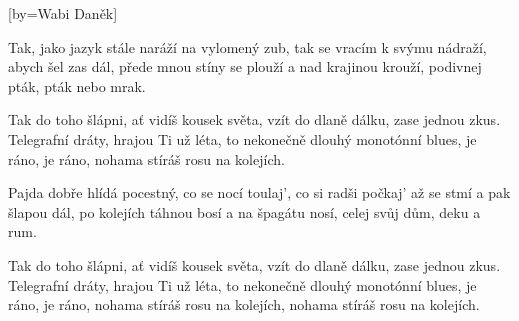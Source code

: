 [by={Wabi Daněk}]

\beginverse{}
Tak, jako jazyk stále naráží na vylomený zub,
tak se vracím k svýmu nádraží, abych šel zas dál,
přede mnou stíny se plouží a nad krajinou krouží,
podivnej pták, pták nebo mrak.
\endverse{}

\beginchorus{}
Tak do toho šlápni, ať vidíš kousek světa,
vzít do dlaně dálku, zase jednou zkus.
Telegrafní dráty, hrajou Ti už léta,
to nekonečně dlouhý  monotónní blues,
je ráno, je ráno, nohama stíráš rosu na kolejích.
\endchorus{}

\beginverse{}
Pajda dobře hlídá pocestný, co se nocí toulaj',
co si radši počkaj' až se stmí a pak šlapou dál,
po kolejích táhnou bosí a na špagátu nosí,
celej svůj dům, deku a rum.
\endverse{}

\beginchorus{}
Tak do toho šlápni, ať vidíš kousek světa,
vzít do dlaně dálku, zase jednou zkus.
Telegrafní dráty, hrajou Ti už léta,
to nekonečně dlouhý  monotónní blues,
je ráno, je ráno, nohama stíráš rosu na kolejích,
nohama stíráš rosu na kolejích.
\endchorus{}

\endsong{}
